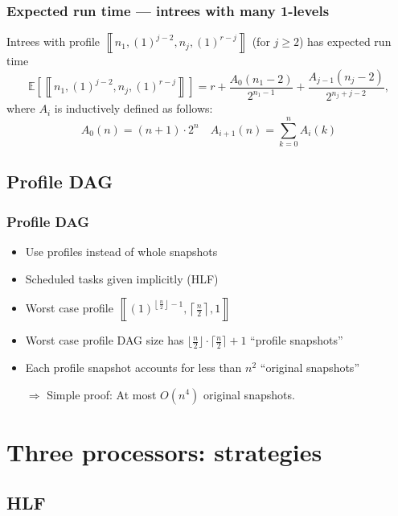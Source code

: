 \documentclass{beamer}
\newcommand{\profile}[1]{\left\llbracket #1 \right\rrbracket}
\newcommand{\profilerepeat}[2]{{(#1)}^{#2}}
\newcommand{\profileones}[1]{\profilerepeat{1}{#1}}
\newcommand{\E}[1]{\mathbb{E}\left[ #1 \right]}
\begin{document}
\begin{frame}
  \frametitle{Expected run time --- intrees with many 1-levels}
  \begin{theorem}
    Intrees with profile $\profile{n_1,\profileones{j-2},n_j,\profileones{r-j}}$ (for $j\geq 2$) has expected run time
    \begin{equation*}
      \E{\profile{n_1,\profileones{j-2},n_j,\profileones{r-j}}} = 
      r + \frac{A_0(n_1-2)}{2^{n_1-1}} + \frac{A_{j-1}(n_j-2)}{2^{n_j+j-2}},
    \end{equation*}
    where $A_i$ is inductively defined as follows:
    \begin{equation*}
      A_0(n) = (n+1) \cdot 2^n \quad 
      A_{i+1}(n) = \sum_{k=0}^n A_{i}(k)
    \end{equation*}
  \end{theorem}
\end{frame}

\subsection{Profile DAG}

\begin{frame}
  \frametitle{Profile DAG}
  \begin{itemize}
  \item Use profiles instead of whole snapshots
  \item Scheduled tasks given implicitly (HLF)
  \item Worst case profile $\profile{ \profileones{ \left\lfloor\frac{n}{2} \right\rfloor - 1}, \left\lceil \frac{n}{2} \right\rceil, 1 }$
  \item Worst case profile DAG size has $\lfloor \frac{n}{2} \rfloor \cdot \lceil \frac{n}{2} \rceil +1$ ``profile snapshots''
  \item Each profile snapshot accounts for less than $n^2$ ``original snapshots''
    
    $\Rightarrow$ Simple proof: At most $O(n^4)$ original snapshots.
  \end{itemize}
\end{frame}

\section{Three processors: strategies}

\subsection{HLF}
\end{document}
